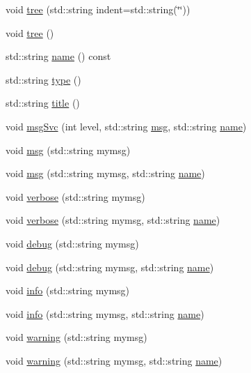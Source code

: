 \begin{DoxyCompactItemize}
\item 
void \hyperlink{classHierarchy_a76e914b9a677a22a82deb74d892bf261}{tree} (std\+::string indent=std\+::string(\char`\"{}\char`\"{}))
\item 
void \hyperlink{classHierarchy_a594c294c5f60c230e106d522ed008212}{tree} ()
\item 
std\+::string \hyperlink{classObject_a300f4c05dd468c7bb8b3c968868443c1}{name} () const
\item 
std\+::string \hyperlink{classObject_a84f99f70f144a83e1582d1d0f84e4e62}{type} ()
\item 
std\+::string \hyperlink{classObject_a73a0f1a41828fdd8303dd662446fb6c3}{title} ()
\item 
void \hyperlink{classObject_a3f9d5537ebce0c0f2bf6ae4d92426f3c}{msg\+Svc} (int level, std\+::string \hyperlink{classObject_a58b2d0618c2d08cf2383012611528d97}{msg}, std\+::string \hyperlink{classObject_a300f4c05dd468c7bb8b3c968868443c1}{name})
\item 
void \hyperlink{classObject_a58b2d0618c2d08cf2383012611528d97}{msg} (std\+::string mymsg)
\item 
void \hyperlink{classObject_ac5d59299273cee27aacf7de00d2e7034}{msg} (std\+::string mymsg, std\+::string \hyperlink{classObject_a300f4c05dd468c7bb8b3c968868443c1}{name})
\item 
void \hyperlink{classObject_a83d2db2df682907ea1115ad721c1c4a1}{verbose} (std\+::string mymsg)
\item 
void \hyperlink{classObject_a2d4120195317e2a3c6532e8bb9f3da68}{verbose} (std\+::string mymsg, std\+::string \hyperlink{classObject_a300f4c05dd468c7bb8b3c968868443c1}{name})
\item 
void \hyperlink{classObject_aac010553f022165573714b7014a15f0d}{debug} (std\+::string mymsg)
\item 
void \hyperlink{classObject_a6c9a0397ca804e04d675ed05683f5420}{debug} (std\+::string mymsg, std\+::string \hyperlink{classObject_a300f4c05dd468c7bb8b3c968868443c1}{name})
\item 
void \hyperlink{classObject_a644fd329ea4cb85f54fa6846484b84a8}{info} (std\+::string mymsg)
\item 
void \hyperlink{classObject_a1ca123253dfd30fc28b156f521dcbdae}{info} (std\+::string mymsg, std\+::string \hyperlink{classObject_a300f4c05dd468c7bb8b3c968868443c1}{name})
\item 
void \hyperlink{classObject_a65cd4fda577711660821fd2cd5a3b4c9}{warning} (std\+::string mymsg)
\item 
void \hyperlink{classObject_a11f101db4dd73d9391b0231818881d86}{warning} (std\+::string mymsg, std\+::string \hyperlink{classObject_a300f4c05dd468c7bb8b3c968868443c1}{name})

\end{DoxyCompactItemize}
